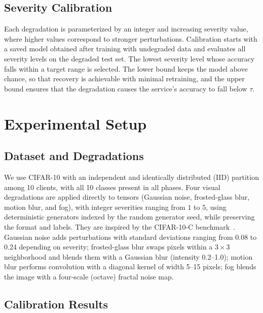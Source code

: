 \documentclass[conference]{IEEEtran}
\begin{document}
\subsection{Severity Calibration}\label{sec:calibration}
Each degradation is parameterized by an integer and increasing severity value, where higher values correspond to stronger perturbations. Calibration starts with a saved model obtained after training with undegraded data and evaluates all severity levels on the degraded test set. The lowest severity level whose accuracy falls within a target range is selected. The lower bound keeps the model above chance, so that recovery is achievable with minimal retraining, and the upper bound ensures that the degradation causes the service’s accuracy to fall below $\tau$.

\section{Experimental Setup}\label{sec:setup}
\subsection{Dataset and Degradations}
We use CIFAR-10 with an independent and identically distributed (IID) partition among 10 clients, with all 10 classes present in all phases. Four visual degradations are applied directly to tensors (Gaussian noise, frosted-glass blur, motion blur, and fog), with integer severities ranging from $1$ to $5$, using deterministic generators indexed by the random generator seed, while preserving the format and labels. They are inspired by the CIFAR-10-C benchmark~\cite{hendrycks2019}. Gaussian noise adds perturbations with standard deviations ranging from 0.08 to 0.24 depending on severity; frosted-glass blur swaps pixels within a $3\times3$ neighborhood and blends them with a Gaussian blur (intensity 0.2--1.0); motion blur performs convolution with a diagonal kernel of width 5--15 pixels; fog blends the image with a four-scale (octave) fractal noise map.
\subsection{Calibration Results}
\end{document}
